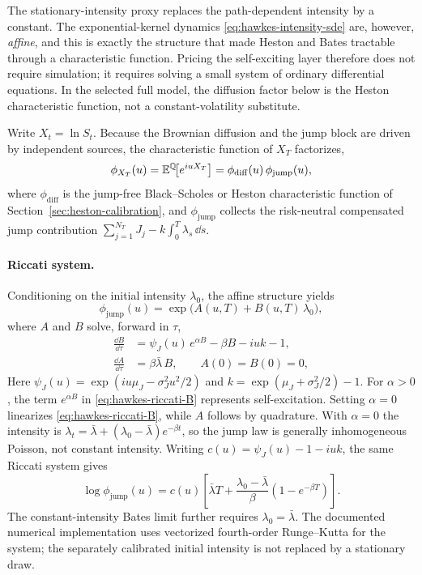 The stationary-intensity proxy replaces the path-dependent intensity by a constant. The exponential-kernel dynamics \eqref{eq:hawkes-intensity-sde} are, however, \emph{affine}, and this is exactly the structure that made Heston and Bates tractable through a characteristic function. Pricing the self-exciting layer therefore does not require simulation; it requires solving a small system of ordinary differential equations. In the selected full model, the diffusion factor below is the Heston characteristic function, not a constant-volatility substitute.

Write \(X_t=\ln S_t\). Because the Brownian diffusion and the jump block are driven by independent sources, the characteristic function of \(X_T\) factorizes,
\begin{equation}
    \phi_{X_T}(u)=\mathbb{E}^{\mathbb{Q}}\!\big[e^{iuX_T}\big]=\phi_{\mathrm{diff}}(u)\,\phi_{\mathrm{jump}}(u),
\end{equation}
where \(\phi_{\mathrm{diff}}\) is the jump-free Black--Scholes or Heston characteristic function of Section~\ref{sec:heston-calibration}, and \(\phi_{\mathrm{jump}}\) collects the risk-neutral compensated jump contribution \(\sum_{j=1}^{N_T}J_j-k\int_0^T\lambda_s\,\dd s\).

\paragraph{Riccati system.}
Conditioning on the initial intensity \(\lambda_0\), the affine structure yields
\begin{equation}
    \phi_{\mathrm{jump}}(u)=\exp\!\big(A(u,T)+B(u,T)\,\lambda_0\big),
\end{equation}
where \(A\) and \(B\) solve, forward in \(\tau\),
\begin{align}
    \frac{\dd B}{\dd\tau}
    &=
    \psi_J(u)\,e^{\alpha B}-\beta B-iuk-1,
    \label{eq:hawkes-riccati-B}
    \\
    \frac{\dd A}{\dd\tau}
    &=
    \beta\bar{\lambda}\,B,
    \qquad A(0)=B(0)=0,
    \label{eq:hawkes-riccati-A}
\end{align}
Here $\psi_J(u)=\exp(iu\mu_J-\sigma_J^2u^2/2)$ and
$k=\exp(\mu_J+\sigma_J^2/2)-1$. For $\alpha>0$, the term
$e^{\alpha B}$ in \eqref{eq:hawkes-riccati-B} represents
self-excitation. Setting $\alpha=0$ linearizes
\eqref{eq:hawkes-riccati-B}, while $A$ follows by quadrature.
With $\alpha=0$ the intensity is
$\lambda_t=\bar\lambda+(\lambda_0-\bar\lambda)e^{-\beta t}$,
so the jump law is generally inhomogeneous Poisson, not constant
intensity. Writing $c(u)=\psi_J(u)-1-iuk$, the same Riccati system gives
\[
\log\phi_{\mathrm{jump}}(u)=c(u)
\left[\bar\lambda T+
\frac{\lambda_0-\bar\lambda}{\beta}(1-e^{-\beta T})\right].
\]
The constant-intensity Bates limit further requires
$\lambda_0=\bar\lambda$. The documented numerical implementation uses
vectorized fourth-order Runge--Kutta for the system; the separately
calibrated initial intensity is not replaced by a stationary draw.

